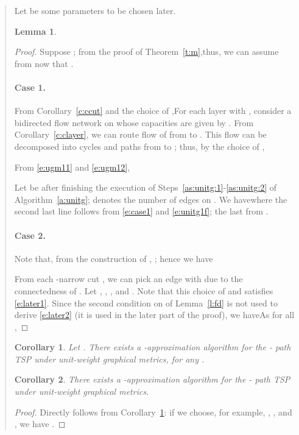 \documentclass[11pt,letterpaper]{article}
\newtheorem{lemma}{Lemma}
\newtheorem{cor}{Corollary}
\newcommand{\st}{\mbox{-} }
\begin{document}
\begin{quote}
Let  be some parameters to be chosen later.

\begin{lemma}\label{l:unitgmain}

\end{lemma}
\begin{proof}
Suppose ; from the proof of Theorem~\ref{t:m},thus, we can assume from now that .

\paragraph{Case 1.}

From Corollary~\ref{c:ccut} and the choice of ,For each layer  with , consider a bidirected flow network on  whose capacities are given by . From Corollary~\ref{c:clayer}, we can route flow of  from  to . This flow can be decomposed into cycles and paths from  to ; thus, by the choice of ,

From \eqref{e:ugm11} and \eqref{e:ugm12},

Let  be  after finishing the execution of Steps~\ref{as:unitg:1}-\ref{as:unitg:2} of Algorithm~\ref{a:unitg};  denotes the number of edges on . We havewhere the second last line follows from \eqref{e:case1} and \eqref{e:unitg1f}; the last from .

\paragraph{Case 2.}Note that, from the construction of , ; hence we have

From each -narrow cut , we can pick an edge  with  due to the connectedness of . Let , , , and . Note that this choice of  and  satisfies \eqref{e:later1}. Since the second condition on  of Lemma~\ref{l:fd} is not used to derive \eqref{e:later2} (it is used in the later part of the proof), we haveAs  for all ,
\end{proof}

\begin{cor}\label{c:unitgar}
Let . There exists a -ap\-proxi\-ma\-tion algorithm for the \st path TSP under unit-weight graphical metrics, for any .
\end{cor}

\begin{cor}
There exists a -approximation algorithm for the \st path TSP under unit-weight graphical metrics.
\end{cor}
\begin{proof}
Directly follows from Corollary~\ref{c:unitgar}: if we choose, for example, , , and , we have .
\end{proof}


\end{quote}
\end{document}
